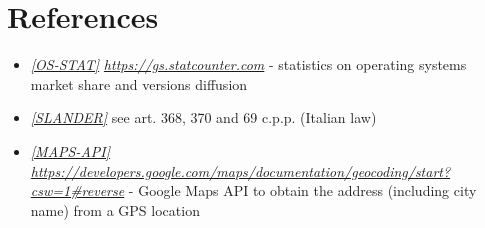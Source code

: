 \documentclass[a4paper]{report}
\begin{document}
\chapter{References}
\begin{itemize}

\item \label{ref:os-stats} \hyperref[use:os-stats]{\textit{[OS-STAT]}} \href{https://gs.statcounter.com}{\textit{https://gs.statcounter.com}} - statistics on operating systems market share and versions diffusion

\item \label{ref:slander} \hyperref[use:slander]{\textit{[SLANDER]}} see art. 368, 370 and 69 c.p.p. (Italian law)

\item \label{ref:maps-api} \hyperref[use:maps-api]{\textit{[MAPS-API]}} \href{https://developers.google.com/maps/documentation/geocoding/start?csw=1\#reverse}{\textit{https://developers.google.com/maps/documentation/geocoding/start?csw=1\#reverse}} - Google Maps API to obtain the address (including city name) from a GPS location

\end{itemize}
\end{document}
